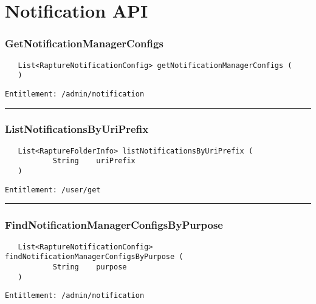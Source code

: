 \chapter{Notification API}

\subsection{GetNotificationManagerConfigs}
\label{Api:GetNotificationManagerConfigs}
\begin{verbatim}
   List<RaptureNotificationConfig> getNotificationManagerConfigs (
   )
\end{verbatim}
\begin{Verbatim}[fontsize=\small, formatcom=\color{Maroon}]
  Entitlement: /admin/notification
\end{Verbatim}



\rule{12cm}{2pt}
\subsection{ListNotificationsByUriPrefix}
\label{Api:ListNotificationsByUriPrefix}
\begin{verbatim}
   List<RaptureFolderInfo> listNotificationsByUriPrefix (
           String    uriPrefix
   )
\end{verbatim}
\begin{Verbatim}[fontsize=\small, formatcom=\color{Maroon}]
  Entitlement: /user/get
\end{Verbatim}



\rule{12cm}{2pt}
\subsection{FindNotificationManagerConfigsByPurpose}
\label{Api:FindNotificationManagerConfigsByPurpose}
\begin{verbatim}
   List<RaptureNotificationConfig> findNotificationManagerConfigsByPurpose (
           String    purpose
   )
\end{verbatim}
\begin{Verbatim}[fontsize=\small, formatcom=\color{Maroon}]
  Entitlement: /admin/notification
\end{Verbatim}



